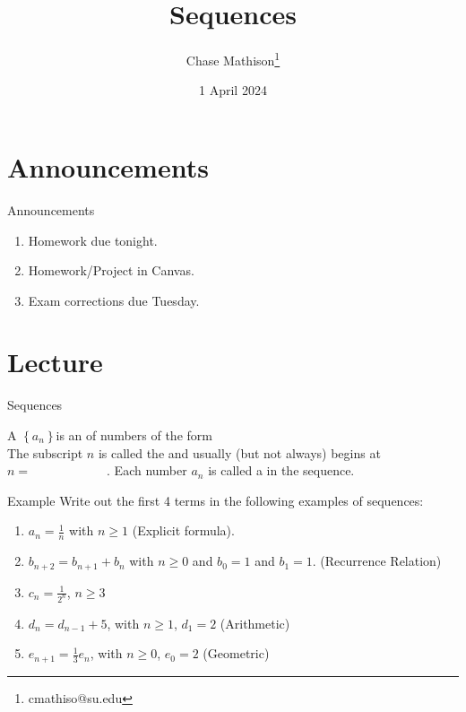 \documentclass[presentation]{beamer}
\institute[SU]{Shenandoah University}
\author{Chase Mathison\thanks{cmathiso@su.edu}}
\date{1 April 2024}
\title{Sequences}
\begin{document}
\maketitle

\section{Announcements}
\label{sec:orgf89c34f}
\begin{frame}[label={sec:org5ee81af}]{Announcements}
\begin{enumerate}
\item Homework due tonight.
\item Homework/Project in Canvas.
\item Exam corrections due Tuesday.
\end{enumerate}
\end{frame}

\section{Lecture}
\label{sec:orge8fc7bd}
\begin{frame}[label={sec:org948a8cc}]{Sequences}
\begin{definition}
A \uline{\hspace*{1in}} \(\left\{ a_n \right\}\)is an \uline{\hspace*{1in}} of numbers of
the form
\[
\hspace{1in}\]
The subscript \(n\) is called the \uline{\hspace*{1in}} and usually (but not always) begins
at \(n = \hspace{1in}\). Each number \(a_n\) is called a \uline{\hspace*{1in}} in the sequence.
\end{definition}
\end{frame}

\begin{frame}[label={sec:orgac073c5}]{Example}
Write out the first 4 terms in the following examples of sequences:
\begin{enumerate}
\item \(a_n = \frac{1}{n}\) with \(n \ge 1\) (Explicit formula).
\item \(b_{n+2} = b_{n+1} + b_{n}\) with \(n \ge 0\) and \(b_0 = 1\) and \(b_1 = 1\). (Recurrence Relation)
\item \(c_n = \frac{1}{2^n}\), \(n \ge 3\)
\item \(d_n = d_{n-1} + 5\), with \(n \ge 1\), \(d_1 = 2\) (Arithmetic)
\item \(e_{n+1} = \frac{1}{3}e_n\), with \(n \ge 0\), \(e_0 = 2\) (Geometric)
\end{enumerate}
\vspace{10in}
\end{frame}
\end{document}

